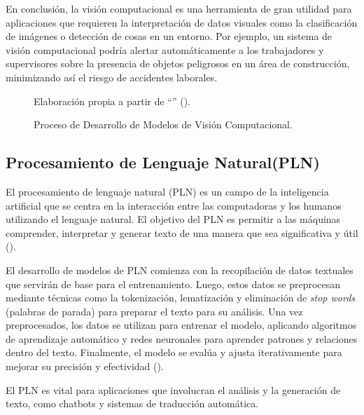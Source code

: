 En conclusión, la visión computacional es una herramienta de gran utilidad para aplicaciones que requieren la interpretación de datos visuales como la clasificación de imágenes o detección de cosas en un entorno. Por ejemplo, un sistema de visión computacional podría alertar automáticamente a los trabajadores y supervisores sobre la presencia de objetos peligrosos en un área de construcción, minimizando así el riesgo de accidentes laborales.

\begin{figure}[htb]
	\centering
    
    \vspace{-0.5cm}
	\caption{Proceso de Desarrollo de Modelos de Visión Computacional.}
    \vspace{-0.2cm}
	\footnotesize{{Elaboración propia a partir de ``\textit{}'' (\citeyear{szeliski2022computer}).}}
	\label{fig:computer_vision} 
\end{figure}

\subsection{Procesamiento de Lenguaje Natural(PLN)}
El procesamiento de lenguaje natural (PLN) es un campo de la inteligencia artificial que se centra en la interacción entre las computadoras y los humanos utilizando el lenguaje natural. El objetivo del PLN es permitir a las máquinas comprender, interpretar y generar texto de una manera que sea significativa y útil (\cite{jurafsky2000speech}).

El desarrollo de modelos de PLN comienza con la recopilación de datos textuales que servirán de base para el entrenamiento. Luego, estos datos se preprocesan mediante técnicas como la tokenización, lematización y eliminación de \textit{stop words} (palabras de parada) para preparar el texto para su análisis. Una vez preprocesados, los datos se utilizan para entrenar el modelo, aplicando algoritmos de aprendizaje automático y redes neuronales para aprender patrones y relaciones dentro del texto. Finalmente, el modelo se evalúa y ajusta iterativamente para mejorar su precisión y efectividad (\cite{schutze2008introduction}).

El PLN es vital para aplicaciones que involucran el análisis y la generación de texto, como chatbots y sistemas de traducción automática.

